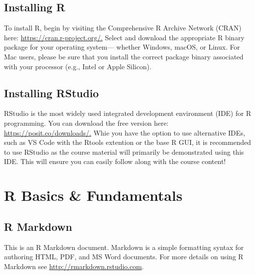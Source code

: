 \documentclass[
  letterpaper,
  DIV=11,
  numbers=noendperiod]{scrreprt}
\begin{document}
\section*{Installing R}\label{installing-r}


To install R, begin by visiting the Comprehensive R Archive Network
(CRAN) here: \url{https://cran.r-project.org/.} Select and download the
appropriate R binary package for your operating system--- whether
Windows, macOS, or Linux. For Mac users, please be sure that you install
the correct package binary associated with your processor (e.g., Intel
or Apple Silicon).

\section*{Installing RStudio}\label{installing-rstudio}


RStudio is the most widely used integrated development environment (IDE)
for R programming. You can download the free version here:
\url{https://posit.co/downloads/.} Whie you have the option to use
alternative IDEs, such as VS Code with the Rtools extention or the base
R GUI, it is recommended to use RStudio as the course material will
primarily be demonstrated using this IDE. This will ensure you can
easily follow along with the course content!


\chapter*{R Basics \& Fundamentals}\label{r-basics-fundamentals}


\section*{R Markdown}\label{r-markdown}


This is an R Markdown document. Markdown is a simple formatting syntax
for authoring HTML, PDF, and MS Word documents. For more details on
using R Markdown see \url{http://rmarkdown.rstudio.com}.
\end{document}
